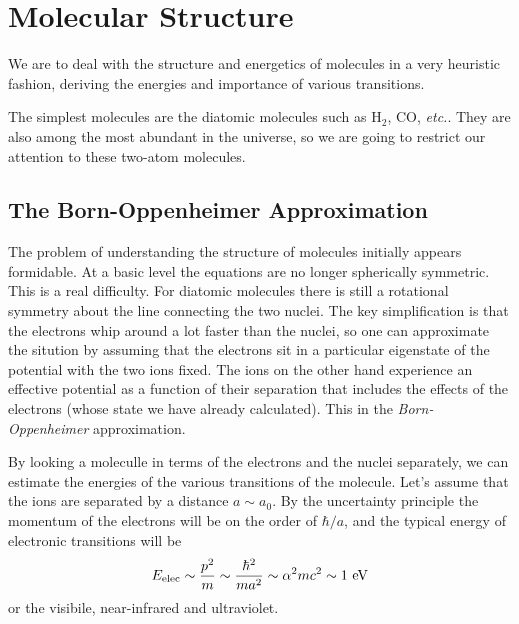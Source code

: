 \chapter{Molecular Structure}
\label{cha:molecular-structure}
We are to deal with the structure and energetics of molecules in a
very heuristic fashion, deriving the energies and importance 
of various transitions.   

The simplest molecules are the diatomic molecules such as H$_2$, CO,
{\em etc.}. They are also among the most abundant in the universe, so
we are going to restrict our attention to these two-atom molecules.

\section{The Born-Oppenheimer Approximation}
\label{sec:born-oppenh-appr}

The problem of understanding the structure of molecules initially
appears formidable.  At a basic level the equations are no longer
spherically symmetric.  This is a real difficulty.  For diatomic
molecules there is still a rotational symmetry about the line
connecting the two nuclei.  The key simplification is that the
electrons whip around a lot faster than the nuclei, so one can
approximate the sitution by assuming that the electrons sit in a
particular eigenstate of the potential with the two ions fixed.
The ions on the other hand experience an effective potential as a
function of their separation that includes the effects of the
electrons (whose state we have already calculated).  This in the {\em
  Born-Oppenheimer} approximation.

By looking a moleculle in terms of the electrons and the nuclei
separately, we can estimate the energies of the various transitions of
the molecule.  Let's assume that the ions are separated by a distance
$a \sim a_0$.  By the uncertainty principle the momentum of the
electrons will be on the order of $\hbar / a$, and the typical energy
of electronic transitions will be
\begin{equation}
E_\textrm{\scriptsize elec} \sim \frac{p^2}{m} \sim 
\frac{\hbar^2}{m a^2} \sim \alpha^2 m c^2 \sim 1~\textrm{eV}
\label{eq:10000}
\end{equation}
or the visibile, near-infrared and ultraviolet.

